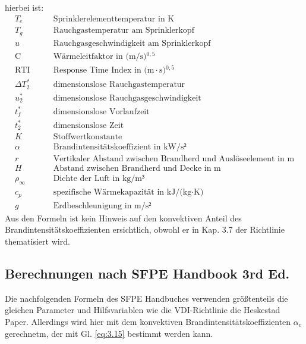 hierbei ist:
\begin{align*}
  T_e &\qquad \text{Sprinklerelementtemperatur in K} \\[3pt]
  T_g &\qquad \text{Rauchgastemperatur am Sprinklerkopf} \\[3pt]
  u &\qquad \text{Rauchgasgeschwindigkeit am Sprinklerkopf} \\[3pt]
  \text{C} &\qquad \text{Wärmeleitfaktor in (m/s)$^{0,5}$} \\[3pt]
  \text{RTI} &\qquad \text{Response Time Index in (m$\cdot$s)$^{0,5}$} \\[3pt]
  \Delta T^*_2 &\qquad \text{dimensionslose Rauchgastemperatur} \\[3pt]
  u^*_2 &\qquad \text{dimensionslose Rauchgasgeschwindigkeit} \\[3pt]
  t^*_f &\qquad \text{dimensionslose Vorlaufzeit} \\[3pt]
  t^*_2 &\qquad \text{dimensionslose Zeit} \\[3pt]
  K &\qquad \text{Stoffwertkonstante} \\[3pt]
  \alpha &\qquad \text{Brandintensitätskoeffizient in kW/s²} \\[4pt]
  r &\qquad \text{Vertikaler Abstand zwischen Brandherd und Auslöseelement in m} \\[4pt]
  H &\qquad \text{Abstand zwischen Brandherd und Decke in m} \\[4pt]
  \rho_\infty &\qquad \text{Dichte der Luft in kg/m³}  \\[4pt]
  c_p &\qquad \text{spezifische Wärmekapazität in kJ/(kg}\cdot\text{K)} \\[4pt]
  g & \qquad \text{Erdbeschleunigung in m/s²}
\end{align*}
 Aus den Formeln ist kein Hinweis auf den konvektiven Anteil des Brandintensitätskoeffizienten ersichtlich, obwohl er in Kap. 3.7 der Richtlinie thematisiert wird.

\subsection{Berechnungen nach SFPE Handbook 3rd Ed.}
\label{sec:Berechnungennachsfpe}

Die nachfolgenden Formeln des SFPE Handbuches verwenden größtenteils die gleichen Parameter und Hilfsvariablen wie die VDI-Richtlinie \bzw die Heskestad Paper. Allerdings wird hier mit dem konvektiven Brandintensitätskoeffizienten $\alpha_c$ gerechnetm, der mit Gl. \ref{eq:3.15} bestimmt werden kann. 

